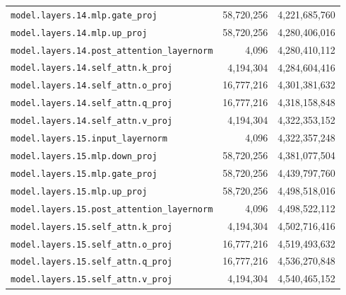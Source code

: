\documentclass[10pt,a4paper]{article}
\theoremstyle{definition}
\begin{document}
\begin{appendices}
\begin{longtable}{p{9.5cm}rr}
\texttt{model.\allowbreak{}layers.\allowbreak{}14.\allowbreak{}mlp.\allowbreak{}gate\_proj} & 58,720,256 & 4,221,685,760 \\
\texttt{model.\allowbreak{}layers.\allowbreak{}14.\allowbreak{}mlp.\allowbreak{}up\_proj} & 58,720,256 & 4,280,406,016 \\
\texttt{model.\allowbreak{}layers.\allowbreak{}14.\allowbreak{}post\_attention\_layernorm} & 4,096 & 4,280,410,112 \\
\texttt{model.\allowbreak{}layers.\allowbreak{}14.\allowbreak{}self\_attn.\allowbreak{}k\_proj} & 4,194,304 & 4,284,604,416 \\
\texttt{model.\allowbreak{}layers.\allowbreak{}14.\allowbreak{}self\_attn.\allowbreak{}o\_proj} & 16,777,216 & 4,301,381,632 \\
\texttt{model.\allowbreak{}layers.\allowbreak{}14.\allowbreak{}self\_attn.\allowbreak{}q\_proj} & 16,777,216 & 4,318,158,848 \\
\texttt{model.\allowbreak{}layers.\allowbreak{}14.\allowbreak{}self\_attn.\allowbreak{}v\_proj} & 4,194,304 & 4,322,353,152 \\
\texttt{model.\allowbreak{}layers.\allowbreak{}15.\allowbreak{}input\_layernorm} & 4,096 & 4,322,357,248 \\
\texttt{model.\allowbreak{}layers.\allowbreak{}15.\allowbreak{}mlp.\allowbreak{}down\_proj} & 58,720,256 & 4,381,077,504 \\
\texttt{model.\allowbreak{}layers.\allowbreak{}15.\allowbreak{}mlp.\allowbreak{}gate\_proj} & 58,720,256 & 4,439,797,760 \\
\texttt{model.\allowbreak{}layers.\allowbreak{}15.\allowbreak{}mlp.\allowbreak{}up\_proj} & 58,720,256 & 4,498,518,016 \\
\texttt{model.\allowbreak{}layers.\allowbreak{}15.\allowbreak{}post\_attention\_layernorm} & 4,096 & 4,498,522,112 \\
\texttt{model.\allowbreak{}layers.\allowbreak{}15.\allowbreak{}self\_attn.\allowbreak{}k\_proj} & 4,194,304 & 4,502,716,416 \\
\texttt{model.\allowbreak{}layers.\allowbreak{}15.\allowbreak{}self\_attn.\allowbreak{}o\_proj} & 16,777,216 & 4,519,493,632 \\
\texttt{model.\allowbreak{}layers.\allowbreak{}15.\allowbreak{}self\_attn.\allowbreak{}q\_proj} & 16,777,216 & 4,536,270,848 \\
\texttt{model.\allowbreak{}layers.\allowbreak{}15.\allowbreak{}self\_attn.\allowbreak{}v\_proj} & 4,194,304 & 4,540,465,152 \\

\end{longtable}
\end{appendices}
\end{document}
